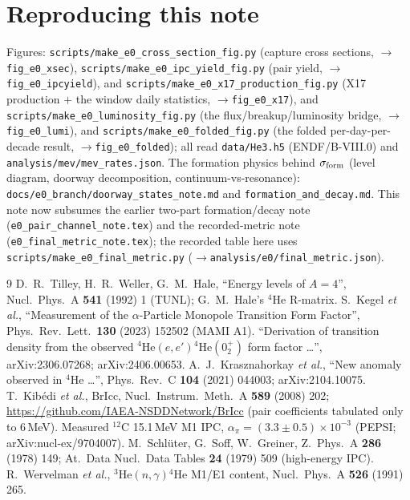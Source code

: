 \documentclass[11pt,a4paper]{article}
\newcommand{\He}[1]{$^{#1}$He}
\begin{document}
\section*{Reproducing this note}
{\raggedright
Figures: \texttt{scripts/make\_e0\_cross\_section\_fig.py} (capture cross
sections, $\to$\texttt{fig\_e0\_xsec}),
\texttt{scripts/make\_e0\_ipc\_yield\_fig.py} (pair yield, $\to$
\texttt{fig\_e0\_ipcyield}), and
\texttt{scripts/make\_e0\_x17\_production\_fig.py} (X17 production $+$ the
window daily statistics, $\to$\texttt{fig\_e0\_x17}), and
\texttt{scripts/make\_e0\_luminosity\_fig.py} (the flux/breakup/luminosity
bridge, $\to$\texttt{fig\_e0\_lumi}), and
\texttt{scripts/make\_e0\_folded\_fig.py} (the folded per-day-per-decade result,
$\to$\texttt{fig\_e0\_folded}); all read \texttt{data/He3.h5}
(ENDF/B-VIII.0) and \texttt{analysis/mev/mev\_rates.json}.
The formation physics behind $\sigma_{\rm form}$ (level diagram, doorway
decomposition, continuum-vs-resonance):
\texttt{docs/e0\_branch/doorway\_states\_note.md} and
\texttt{formation\_and\_decay.md}. This note now subsumes the earlier
two-part formation/decay note (\texttt{e0\_pair\_channel\_note.tex}) and the
recorded-metric note (\texttt{e0\_final\_metric\_note.tex}); the recorded
table here uses \texttt{scripts/make\_e0\_final\_metric.py}
($\to$\texttt{analysis/e0/final\_metric.json}).
\par}

\begin{thebibliography}{9}
\small\sloppy
{} D.~R.~Tilley, H.~R.~Weller, G.~M.~Hale, ``Energy levels of
  $A=4$'', Nucl.\ Phys.\ A \textbf{541} (1992) 1 (TUNL); G.~M.~Hale's \He{4}
  R-matrix.
 S.~Kegel \emph{et al.}, ``Measurement of the $\alpha$-Particle
  Monopole Transition Form Factor'', Phys.\ Rev.\ Lett.\ \textbf{130} (2023)
  152502 (MAMI A1).
 ``Derivation of transition density from the observed
  \He{4}$(e,e')$\He{4}$(0^+_2)$ form factor \dots'', arXiv:2306.07268;
  arXiv:2406.00653.
 A.~J.~Krasznahorkay \emph{et al.}, ``New anomaly observed in
  \He{4} \dots'', Phys.\ Rev.\ C \textbf{104} (2021) 044003; arXiv:2104.10075.
 T.~Kib\'edi \emph{et al.}, BrIcc, Nucl.\ Instrum.\ Meth.\ A
  \textbf{589} (2008) 202; \url{https://github.com/IAEA-NSDDNetwork/BrIcc}
  (pair coefficients tabulated only to 6\,MeV).
 Measured $^{12}$C 15.1\,MeV M1 IPC, $\alpha_\pi=(3.3\pm0.5)
  \times10^{-3}$ (PEPSI; arXiv:nucl-ex/9704007).
 M.~Schl\"uter, G.~Soff, W.~Greiner, Z.~Phys.\ A \textbf{286} (1978)
  149; At.\ Data Nucl.\ Data Tables \textbf{24} (1979) 509 (high-energy IPC).
 R.~Wervelman \emph{et al.}, \He{3}$(n,\gamma)$\He{4} M1/E1
  content, Nucl.\ Phys.\ A \textbf{526} (1991) 265.
\end{thebibliography}
\end{document}
